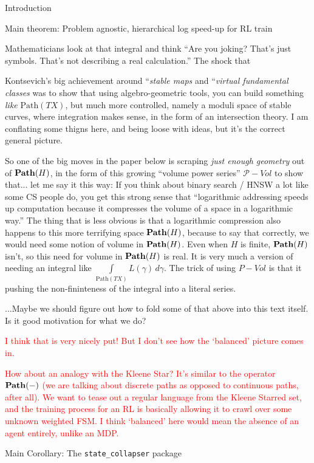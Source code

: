 \documentclass[11pt]{article}
\begin{document}
\begin{section}{Introduction}
\begin{subsection}{Main theorem: Problem agnostic, hierarchical log speed-up for RL train}
{Mathematicians look at that integral and think ``Are you joking? That's just symbols. That's not describing a real calculation.'' The shock that

Kontsevich's big achievement around ``{\em stable maps} and ``{\em virtual fundamental classes} was to show that using algebro-geometric tools, you can build something {\em like} $\text{Path}(TX)$, but much more controlled, namely a moduli space of stable curves, where integration makes sense, in the form of an intersection theory. I am conflating some thigns here, and being loose with ideas, but it's the correct general picture. \cite{COGP} \cite{Katz} \cite{Kontsevich95}

So one of the big moves in the paper below is scraping {\em just enough geometry} out of $\bold{Path}(H)$, in the form of this growing ``volume power series'' $\mathcal{P}-Vol$ to show that... let me say it this way: If you think about binary search / HNSW a lot like some CS people do, you get this strong sense that ``logarithmic addressing speeds up computation because it compresses the volume of a space in a logarithmic way.'' The thing that is less obvious is that a logarithmic compression also happens to this more terrifying space $\bold{Path}(H)$, because to say that correctly, we would need some notion of volume in $\bold{Path}(H)$. Even when $H$ is finite, $\bold{Path}(H)$ isn't, so this need for volume in $\bold{Path}(H)$ is real. It is very much a version of needing an integral like $\underset{\text{Path}(TX)}{\int}\!\!\!\!\!\!L(\gamma)\,d\gamma$.  The trick of using $P-Vol$ is that it pushing the non-fininteness of the integral into a literal series.

...Maybe we should figure out how to fold some of that above into this text itself. Is it good motivation for what we do?
}\textcolor{red}{I think that is very nicely put! But I don't see how the `balanced' picture comes in.}

\textcolor{red}{How about an analogy with the Kleene Star? It's similar to the operator $\bold{Path}(-)$ (we are talking about discrete paths as opposed to continuous paths, after all). We want to tease out a regular language from the Kleene Starred set, and the training process for an RL is basically allowing it to crawl over some unknown weighted FSM. I think `balanced' here would mean the absence of an agent entirely, unlike an MDP.}

\end{subsection}

\begin{subsection}{Main Corollary: The \texttt{state\_collapser} package}


\end{subsection}
\end{section}
\end{document}
